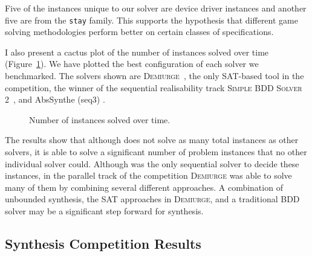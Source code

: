 Five of the instances unique to our solver are device driver instances and another five are from the \texttt{stay} family. This supports the hypothesis that different game solving methodologies perform better on certain classes of specifications.

I also present a cactus plot of the number of instances solved over time (Figure~\ref{fig:cactus}). We have plotted the best configuration of each solver we benchmarked. The solvers shown are \textsc{Demiurge}~\cite{Bloem14}, the only SAT-based tool in the competition, the winner of the sequential realisability track \textsc{Simple BDD Solver 2}~\cite{Walker14}, and AbsSynthe (seq3) \cite{Brenguier14}.

\begin{figure}
    \centering
    \pgfplotsset{width=\textwidth}
    \caption{Number of instances solved over time.}
    \label{fig:cactus}
\end{figure}

The results show that although \termitesat does not solve as many total instances as other solvers, it is able to solve a significant number of problem instances that no other individual solver could. Although \termitesat was the only sequential solver to decide these instances, in the parallel track of the competition \textsc{Demiurge} was able to solve many of them by combining several different approaches.  A combination of unbounded synthesis, the SAT approaches in \textsc{Demiurge}, and a traditional BDD solver may be a significant step forward for synthesis.

\clearpage
\subsection{Synthesis Competition Results}

